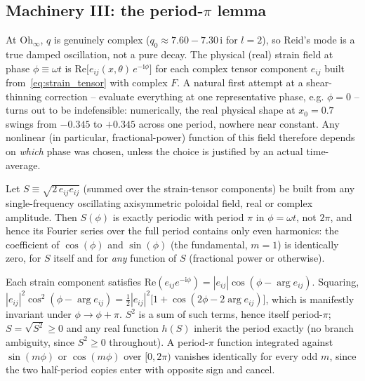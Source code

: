 \subsection{Machinery III: the period-$\pi$ lemma}
\label{sec:cy_period_pi}

At $\mathrm{Oh}_\infty$, $q$ is genuinely complex ($q_0\approx
7.60-7.30\,\mathrm{i}$ for $l=2$), so Reid's mode is a true damped
oscillation, not a pure decay. The physical (real) strain field at phase
$\phi\equiv\omega t$ is $\mathrm{Re}\bigl[e_{ij}(x,\theta)\,e^{-\mathrm{i}\phi}\bigr]$
for each complex tensor component $e_{ij}$ built from~\eqref{eq:strain_tensor}
with complex $F$. A natural first attempt at a shear-thinning correction --
evaluate everything at one representative phase, e.g. $\phi=0$ -- turns out
to be indefensible: numerically, the real physical shape at $x_0=0.7$
swings from $-0.345$ to $+0.345$ across one period, nowhere near constant.
Any nonlinear (in particular, fractional-power) function of this field
therefore depends on \emph{which} phase was chosen, unless the choice is
justified by an actual time-average.

\begin{keybox}
Let $S\equiv\sqrt{2\,e_{ij}e_{ij}}$ (summed over the strain-tensor
components) be built from any single-frequency oscillating axisymmetric
poloidal field, real or complex amplitude. Then $S(\phi)$ is exactly
periodic with period $\pi$ in $\phi=\omega t$, not $2\pi$, and hence its
Fourier series over the full period contains only even harmonics: the
coefficient of $\cos(\phi)$ and $\sin(\phi)$ (the fundamental, $m=1$) is
identically zero, for $S$ itself and for \emph{any} function of $S$
(fractional power or otherwise).
\end{keybox}

\begin{derivbox}[Proof]
Each strain component satisfies
$\mathrm{Re}(e_{ij}e^{-\mathrm{i}\phi})=|e_{ij}|\cos(\phi-\arg e_{ij})$.
Squaring, $|e_{ij}|^2\cos^2(\phi-\arg e_{ij}) =
\tfrac12|e_{ij}|^2\bigl[1+\cos(2\phi-2\arg e_{ij})\bigr]$, which is
manifestly invariant under $\phi\to\phi+\pi$. $S^2$ is a sum of such terms,
hence itself period-$\pi$; $S=\sqrt{S^2}\ge0$ and any real function $h(S)$
inherit the period exactly (no branch ambiguity, since $S^2\ge 0$
throughout). A period-$\pi$ function integrated against $\sin(m\phi)$ or
$\cos(m\phi)$ over $[0,2\pi)$ vanishes identically for every odd $m$, since
the two half-period copies enter with opposite sign and cancel.
\end{derivbox}

